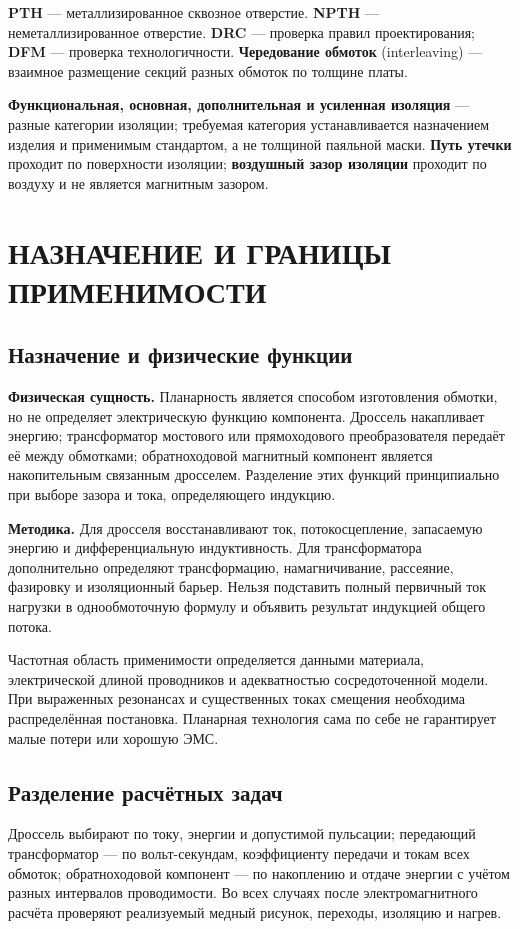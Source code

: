 \documentclass[14pt,a4paper]{extarticle}
\newcommand{\phys}{\par\noindent\textbf{Физическая сущность.} }
\newcommand{\method}{\par\noindent\textbf{Методика.} }
\begin{document}
\textbf{PTH} --- металлизированное сквозное отверстие. \textbf{NPTH} --- неметаллизированное отверстие. \textbf{DRC} --- проверка правил проектирования; \textbf{DFM} --- проверка технологичности. \textbf{Чередование обмоток} (interleaving) --- взаимное размещение секций разных обмоток по толщине платы.

\textbf{Функциональная, основная, дополнительная и усиленная изоляция} --- разные категории изоляции; требуемая категория устанавливается назначением изделия и применимым стандартом, а не толщиной паяльной маски. \textbf{Путь утечки} проходит по поверхности изоляции; \textbf{воздушный зазор изоляции} проходит по воздуху и не является магнитным зазором.

\section{НАЗНАЧЕНИЕ И ГРАНИЦЫ ПРИМЕНИМОСТИ}
\label{pl:scope}
\subsection{Назначение и физические функции}
\phys Планарность является способом изготовления обмотки, но не определяет электрическую функцию компонента. Дроссель накапливает энергию; трансформатор мостового или прямоходового преобразователя передаёт её между обмотками; обратноходовой магнитный компонент является накопительным связанным дросселем. Разделение этих функций принципиально при выборе зазора и тока, определяющего индукцию.\cite{web1,web35}

\method Для дросселя восстанавливают ток, потокосцепление, запасаемую энергию и дифференциальную индуктивность. Для трансформатора дополнительно определяют трансформацию, намагничивание, рассеяние, фазировку и изоляционный барьер. Нельзя подставить полный первичный ток нагрузки в однообмоточную формулу и объявить результат индукцией общего потока.

Частотная область применимости определяется данными материала, электрической длиной проводников и адекватностью сосредоточенной модели. При выраженных резонансах и существенных токах смещения необходима распределённая постановка. Планарная технология сама по себе не гарантирует малые потери или хорошую ЭМС.

\subsection{Разделение расчётных задач}
Дроссель выбирают по току, энергии и допустимой пульсации; передающий трансформатор --- по вольт-секундам, коэффициенту передачи и токам всех обмоток; обратноходовой компонент --- по накоплению и отдаче энергии с учётом разных интервалов проводимости. Во всех случаях после электромагнитного расчёта проверяют реализуемый медный рисунок, переходы, изоляцию и нагрев.
\end{document}
